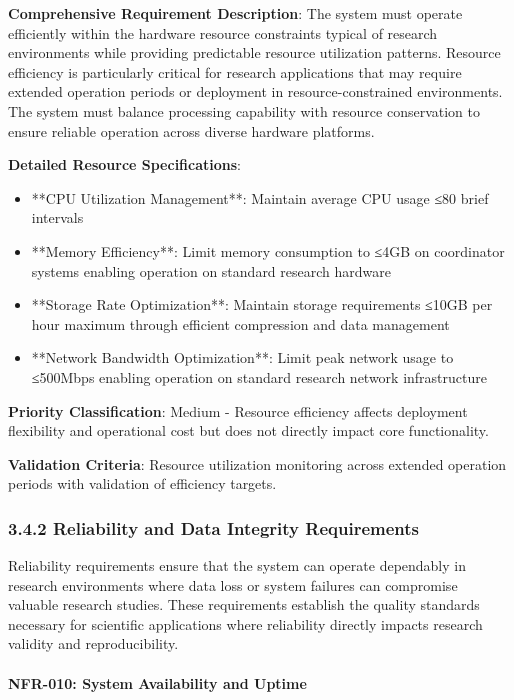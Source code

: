\documentclass[12pt,a4paper]{article}
\begin{document}
\textbf{Comprehensive Requirement Description}: The system must operate efficiently within the hardware resource constraints
typical of research environments while providing predictable resource utilization patterns. Resource efficiency is
particularly critical for research applications that may require extended operation periods or deployment in
resource-constrained environments. The system must balance processing capability with resource conservation to ensure
reliable operation across diverse hardware platforms.

\textbf{Detailed Resource Specifications}:

\begin{itemize}
\item **CPU Utilization Management**: Maintain average CPU usage ≤80%
  brief intervals
\item **Memory Efficiency**: Limit memory consumption to ≤4GB on coordinator systems enabling operation on standard research
  hardware
\item **Storage Rate Optimization**: Maintain storage requirements ≤10GB per hour maximum through efficient compression and
  data management
\item **Network Bandwidth Optimization**: Limit peak network usage to ≤500Mbps enabling operation on standard research
  network infrastructure

\end{itemize}
\textbf{Priority Classification}: Medium - Resource efficiency affects deployment flexibility and operational cost but does
not directly impact core functionality.

\textbf{Validation Criteria}: Resource utilization monitoring across extended operation periods with validation of efficiency
targets.

\subsubsection{3.4.2 Reliability and Data Integrity Requirements}

Reliability requirements ensure that the system can operate dependably in research environments where data loss or
system failures can compromise valuable research studies. These requirements establish the quality standards necessary
for scientific applications where reliability directly impacts research validity and reproducibility.

\paragraph{NFR-010: System Availability and Uptime}
\end{document}
